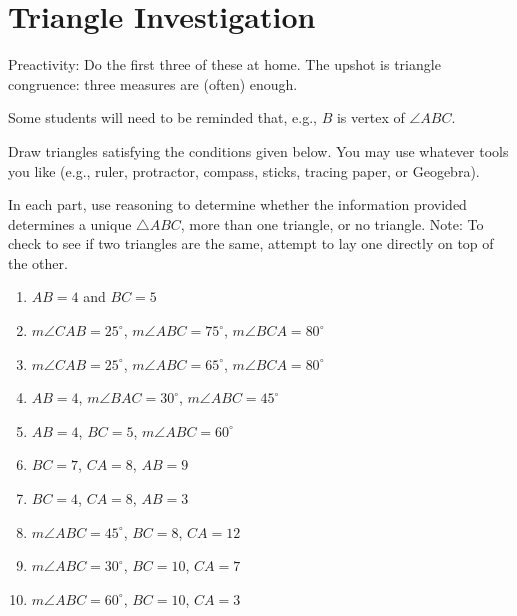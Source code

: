 \newpage

\section{Triangle Investigation}

\begin{teachingnote}
Preactivity:  Do the first three of these at home.  The upshot is triangle congruence:  three measures are (often) enough.  

Some students will need to be reminded that, e.g., $B$ is vertex of $\angle ABC$.
\end{teachingnote}

\begin{prob}
Draw triangles satisfying the conditions given below.  You may use whatever tools you like (e.g., ruler, protractor, compass, sticks, tracing paper, or Geogebra).  

In each part, use reasoning to determine whether the information provided determines a unique $\triangle ABC$, more than one triangle, or no triangle.   Note:  To check to see if two triangles are the same, attempt to lay one directly on top of the other.  

\begin{enumerate}

\item $AB = 4$ and $BC = 5$
\item $m\angle CAB = 25^\circ$, $m\angle ABC = 75^\circ$, $m\angle BCA = 80^\circ$
\item $m\angle CAB = 25^\circ$, $m\angle ABC = 65^\circ$, $m\angle BCA = 80^\circ$
\item $AB = 4$, $m\angle BAC = 30^\circ$, $m\angle ABC = 45^\circ$
\item $AB = 4$, $BC = 5$, $m\angle ABC = 60^\circ$
\item $BC = 7$, $CA = 8$, $AB = 9$
\item $BC = 4$, $CA = 8$, $AB = 3$
\item $m\angle ABC = 45^\circ$, $BC = 8$, $CA = 12$
\item $m\angle ABC = 30^\circ$, $BC = 10$, $CA = 7$
\item $m\angle ABC = 60^\circ$, $BC = 10$, $CA = 3$

\end{enumerate}

\end{prob}
